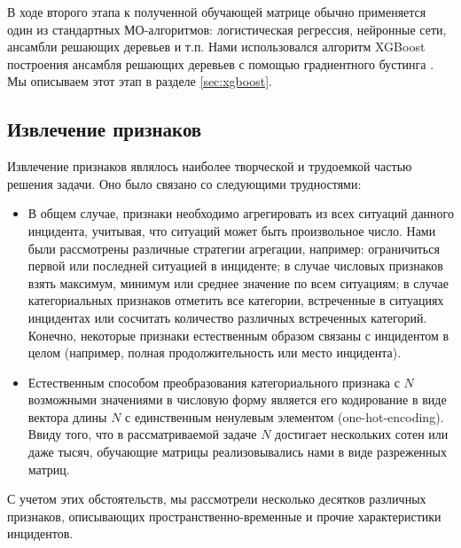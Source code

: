 В ходе второго этапа к полученной обучающей матрице обычно применяется один из стандартных МО-алгоритмов: логистическая регрессия, нейронные сети, ансамбли решающих деревьев и т.п. Нами использовался алгоритм XGBoost построения ансамбля решающих деревьев с помощью градиентного бустинга \cite{chen2016xgboost}. Мы описываем этот этап в разделе \ref{sec:xgboost}.

\subsection{Извлечение признаков}\label{sec:feature_extraction}
Извлечение признаков являлось наиболее творческой и трудоемкой частью решения задачи. Оно было связано со следующими трудностями:
\begin{itemize}
\item В общем случае, признаки необходимо агрегировать из всех ситуаций данного инцидента, учитывая, что ситуаций может быть произвольное число. Нами были рассмотрены различные стратегии агрегации, например: ограничиться первой или последней ситуацией в инциденте; в случае числовых признаков взять максимум, минимум или среднее значение по всем ситуациям; в случае категориальных признаков отметить все категории, встреченные в ситуациях инцидентах или сосчитать количество различных встреченных категорий. Конечно, некоторые признаки естественным образом связаны с инцидентом в целом (например, полная продолжительность или место инцидента).
\item Естественным способом преобразования категориального признака с $N$ возможными значениями в числовую форму является его кодирование в виде вектора длины $N$ с единственным ненулевым элементом (one-hot-encoding). Ввиду того, что в рассматриваемой задаче $N$ достигает нескольких сотен или даже тысяч,  обучающие матрицы реализовывались нами в виде разреженных матриц.
\end{itemize}
С учетом этих обстоятельств, мы рассмотрели несколько десятков различных признаков, описывающих пространственно-временные и прочие характеристики инцидентов.

